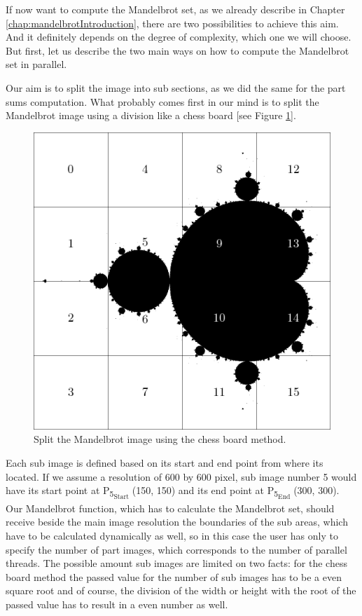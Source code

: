If now want to compute the Mandelbrot set, as we already describe in Chapter \ref{chap:mandelbrotIntroduction}, there are two possibilities to achieve this aim. And it definitely depends on the degree of complexity, which one we will choose. But first, let us describe the two main ways on how to compute the Mandelbrot set in parallel. 

Our aim is to split the image into sub sections, as we did the same for the part sums computation. What probably comes first in our mind is to split the Mandelbrot image using a division like a chess board [see Figure \ref{fig:mandelbrotChessboard}].

\begin{figure}[htbp]
	\centerline{\includegraphics[width=0.75\linewidth]{images/mandelbrot-chess-board.png}}
	\caption{ Split the Mandelbrot image using the chess board method. }
	\label{fig:mandelbrotChessboard}
\end{figure} 

Each sub image is defined based on its start and end point from where its located. If we assume a resolution of 600 by 600 pixel, sub image number 5 would have its start point at P\textsubscript{5\textsubscript{Start}} (150, 150) and its end point at P\textsubscript{5\textsubscript{End}} (300, 300). Our Mandelbrot function, which has to calculate the Mandelbrot set, should receive beside the main image resolution the boundaries of the sub areas, which have to be calculated dynamically as well, so in this case the user has only to specify the number of part images, which corresponds to the number of parallel threads. The possible amount sub images are limited on two facts: for the chess board method the passed value for the number of sub images has to be a even square root and of course, the division of the width or height with the root of the passed value has to result in a even number as well.

